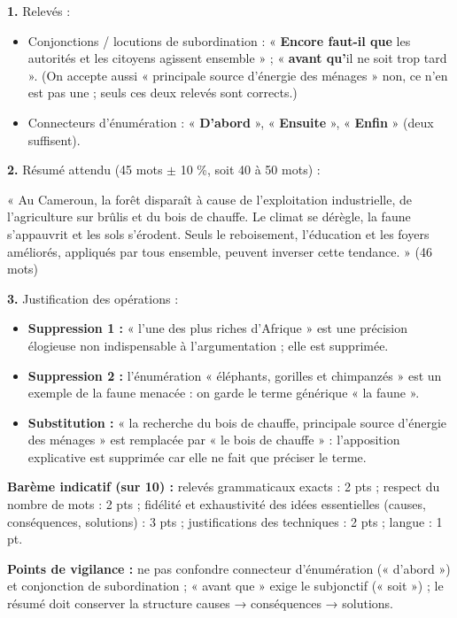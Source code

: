 \documentclass[11pt]{article}
\begin{document}
\begin{corrige}
\textbf{1.} Relevés :
\begin{itemize}
\item Conjonctions / locutions de subordination : « \textbf{Encore faut-il que} les autorités et les citoyens agissent ensemble » ; « \textbf{avant qu'}il ne soit trop tard ». (On accepte aussi « principale source d'énergie des ménages » non, ce n'en est pas une ; seuls ces deux relevés sont corrects.)
\item Connecteurs d'énumération : « \textbf{D'abord} », « \textbf{Ensuite} », « \textbf{Enfin} » (deux suffisent).
\end{itemize}

\textbf{2.} Résumé attendu (45 mots $\pm$ 10 \%, soit 40 à 50 mots) :

« Au Cameroun, la forêt disparaît à cause de l'exploitation industrielle, de l'agriculture sur brûlis et du bois de chauffe. Le climat se dérègle, la faune s'appauvrit et les sols s'érodent. Seuls le reboisement, l'éducation et les foyers améliorés, appliqués par tous ensemble, peuvent inverser cette tendance. » (46 mots)

\textbf{3.} Justification des opérations :
\begin{itemize}
\item \textbf{Suppression 1 :} « l'une des plus riches d'Afrique » est une précision élogieuse non indispensable à l'argumentation ; elle est supprimée.
\item \textbf{Suppression 2 :} l'énumération « éléphants, gorilles et chimpanzés » est un exemple de la faune menacée : on garde le terme générique « la faune ».
\item \textbf{Substitution :} « la recherche du bois de chauffe, principale source d'énergie des ménages » est remplacée par « le bois de chauffe » : l'apposition explicative est supprimée car elle ne fait que préciser le terme.
\end{itemize}

\textbf{Barème indicatif (sur 10) :} relevés grammaticaux exacts : 2 pts ; respect du nombre de mots : 2 pts ; fidélité et exhaustivité des idées essentielles (causes, conséquences, solutions) : 3 pts ; justifications des techniques : 2 pts ; langue : 1 pt.

\textbf{Points de vigilance :} ne pas confondre connecteur d'énumération (« d'abord ») et conjonction de subordination ; « avant que » exige le subjonctif (« soit ») ; le résumé doit conserver la structure causes → conséquences → solutions.
\end{corrige}
\end{document}
